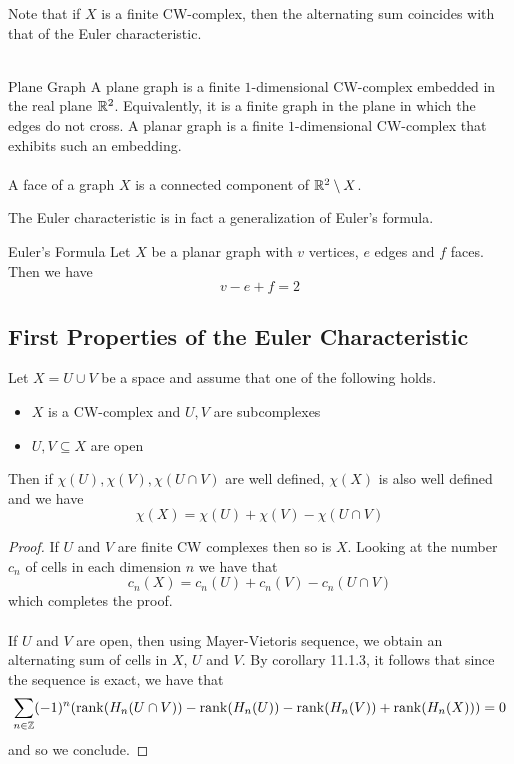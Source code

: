 \documentclass[a4paper]{article}
\begin{document}
Note that if $X$ is a finite CW-complex, then the alternating sum coincides with that of the Euler characteristic. \\~\\

\begin{defn}{Plane Graph}{} A plane graph is a finite $1$-dimensional CW-complex embedded in the real plane $\mathbb{R}^2$. Equivalently, it is a finite graph in the plane in which the edges do not cross. A planar graph is a finite $1$-dimensional CW-complex that exhibits such an embedding. \\~\\

A face of a graph $X$ is a connected component of $\mathbb{R}^2\setminus X$. 
\end{defn}

The Euler characteristic is in fact a generalization of Euler's formula. 

\begin{prp}{Euler's Formula}{} Let $X$ be a planar graph with $v$ vertices, $e$ edges and $f$ faces. Then we have $$v-e+f=2$$
\end{prp}

\subsection{First Properties of the Euler Characteristic}
\begin{prp}{}{} Let $X=U\cup V$ be a space and assume that one of the following holds. 
\begin{itemize}
\item $X$ is a CW-complex and $U,V$ are subcomplexes
\item $U,V\subseteq X$ are open
\end{itemize}
Then if $\chi(U),\chi(V),\chi(U\cap V)$ are well defined, $\chi(X)$ is also well defined and we have $$\chi(X)=\chi(U)+\chi(V)-\chi(U\cap V)$$ \tcbline
\begin{proof}
If $U$ and $V$ are finite CW complexes then so is $X$. Looking at the number $c_n$ of cells in each dimension $n$ we have that $$c_n(X)=c_n(U)+c_n(V)-c_n(U\cap V)$$ which completes the proof. \\~\\

If $U$ and $V$ are open, then using Mayer-Vietoris sequence, we obtain an alternating sum of cells in $X$, $U$ and $V$. By corollary 11.1.3, it follows that since the sequence is exact, we have that $$\sum_{n\in\mathbb{Z}}(-1)^n(\rank(H_n(U\cap V))-\rank(H_n(U))-\rank(H_n(V))+\rank(H_n(X)))=0$$ and so we conclude. 
\end{proof}
\end{prp}
\end{document}

